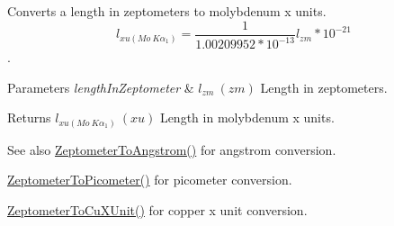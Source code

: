 Converts a length in zeptometers to molybdenum x units. \[ l_{xu(Mo\ K\alpha_1)}=\frac{1}{1.00209952*10^{-13}} l_{zm} * 10^{-21}\]. 


\begin{DoxyParams}{Parameters}
{\em length\+In\+Zeptometer} & $ l_{zm}\ (zm)$ Length in zeptometers. \\
\hline
\end{DoxyParams}
\begin{DoxyReturn}{Returns}
$ l_{xu(Mo\ K\alpha_1)}\ (xu)$ Length in molybdenum x units. 
\end{DoxyReturn}
\begin{DoxySeeAlso}{See also}
\mbox{\hyperlink{group___e_g_x_math-_conversions-_length_conversions-_zeptometer-_non-_s_i_gaa7023afd2a269dddf741cb4299803ef2}{Zeptometer\+To\+Angstrom()}} for angstrom conversion. 

\mbox{\hyperlink{group___e_g_x_math-_conversions-_length_conversions-_zeptometer-_s_i_gae7409493227692a85b7fa5016a007de3}{Zeptometer\+To\+Picometer()}} for picometer conversion. 

\mbox{\hyperlink{group___e_g_x_math-_conversions-_length_conversions-_zeptometer-_non-_s_i_gaeeff3d1ea7d8cd0c703419ce16fcadd7}{Zeptometer\+To\+Cu\+X\+Unit()}} for copper x unit conversion. 
\end{DoxySeeAlso}
